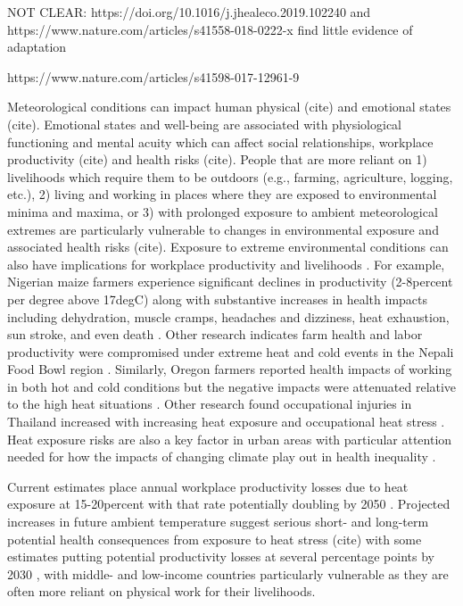 \documentclass{article}
\begin{document}
NOT CLEAR: https://doi.org/10.1016/j.jhealeco.2019.102240 and https://www.nature.com/articles/s41558-018-0222-x find little evidence of adaptation



https://www.nature.com/articles/s41598-017-12961-9




Meteorological conditions can impact human physical (cite) and emotional states (cite). Emotional states and well-being are associated with physiological functioning and mental acuity which can affect social relationships, workplace productivity (cite) and health risks (cite). People that are more reliant on 1) livelihoods which require them to be outdoors (e.g., farming, agriculture, logging, etc.), 2) living and working in places where they are exposed to environmental minima and maxima, or 3) with prolonged exposure to ambient meteorological extremes are particularly vulnerable to changes in environmental exposure \citep{frimpong_heat_2017} and associated health risks (cite). Exposure to extreme environmental conditions can also have implications for workplace productivity and livelihoods \cite{kjellstrom_impact_2016}. For example, Nigerian maize farmers experience significant declines in productivity (2-8percent per degree above 17degC) along with substantive increases in health impacts including dehydration, muscle cramps, headaches and dizziness, heat exhaustion, sun stroke, and even death \cite{sadiq_impact_2019}. Other research indicates farm health and labor productivity were compromised under extreme heat and cold events in the Nepali Food Bowl region \cite{budhathoki_socio-economic_2019}. Similarly, Oregon farmers reported health impacts of working in both hot and cold conditions but the negative impacts were attenuated relative to the high heat situations \cite{bethel_heat-related_2014}. Other research found occupational injuries in Thailand increased with increasing heat exposure and occupational heat stress \cite{tawatsupa_association_2013}. Heat exposure risks are also a key factor in urban areas with particular attention needed for how the impacts of changing climate play out in health inequality \cite{friel_urban_2011}. 

Current estimates place annual workplace productivity losses due to heat exposure at 15-20percent with that rate potentially doubling by 2050 \cite{kjellstrom_heat_2016}. Projected increases in future ambient temperature suggest serious short- and long-term potential health consequences from exposure to heat stress (cite) with some estimates putting potential productivity losses at several percentage points by 2030 \cite{kjellstrom_heat_2016}, with middle- and low-income countries particularly vulnerable as they are often more reliant on physical work for their livelihoods. 
\end{document}
